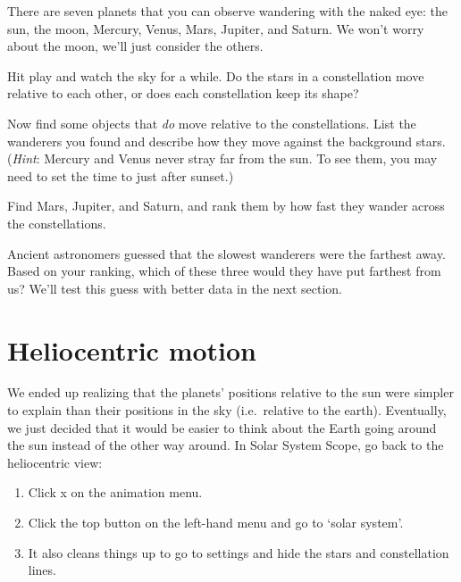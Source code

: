 \documentclass{handout}
\begin{document}
There are seven planets that you can observe wandering with the naked eye: the sun, the moon, Mercury, Venus, Mars, Jupiter, and Saturn. We won't worry about the moon, we'll just consider the others.
\clearpage
\begin{questions}
    \question Hit play and watch the sky for a while. Do the stars in a constellation move relative to each other, or does each constellation keep its shape?

    \answerspace{1in}

    \question Now find some objects that \emph{do} move relative to the constellations. List the wanderers you found and describe how they move against the background stars. (\textit{Hint}: Mercury and Venus never stray far from the sun. To see them, you may need to set the time to just after sunset.)

    \answerspace{1.5in}

    \question Find Mars, Jupiter, and Saturn, and rank them by how fast they wander across the constellations.


    \answerspace{.75in}

    \question Ancient astronomers guessed that the slowest wanderers were the farthest away. Based on your ranking, which of these three would they have put farthest from us? We'll test this guess with better data in the next section.

    \answerspace{1in}
\end{questions}

\clearpage
\section{Heliocentric motion}
We ended up realizing that the planets' positions relative to the sun were simpler to explain than their positions in the sky (i.e.\ relative to the earth). Eventually, we just decided that it would be easier to think about the Earth going around the sun instead of the other way around. In Solar System Scope, go back to the heliocentric view:
\begin{enumerate}
    \item Click x on the animation menu.
    \item Click the top button on the left-hand menu and go to `solar system'.
    \item It also cleans things up to go to settings and hide the stars and constellation lines.
\end{enumerate}
\end{document}
